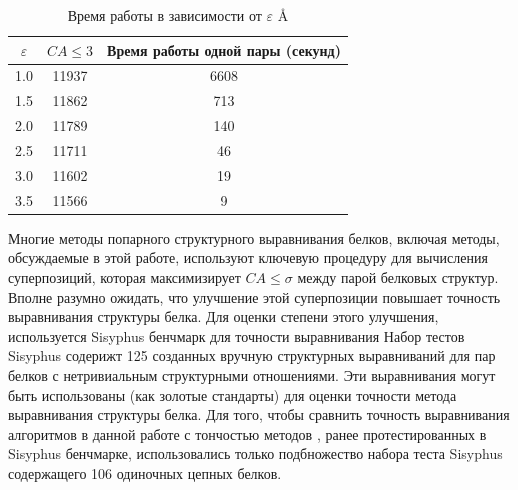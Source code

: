 \documentclass[a4papper]{article}
\newcommand{\angstrom}{\text\normalfont\AA}
\newcommand{\eps}{\varepsilon}
\begin{document}
\begin{center}
\begin{table}
\caption{ Время работы в зависимости от $\eps$ \angstrom}
\begin{tabular}{|c|c|c|}
\hline
$\eps$ & $CA \leq 3$  & Время работы одной пары (секунд)\\
\hline
1.0 & 11937 & 6608\\
1.5 & 11862 & 713\\
2.0 & 11789 & 140\\
2.5 & 11711 & 46\\
3.0 & 11602 & 19\\
3.5 & 11566 & 9\\
\hline
\end{tabular}
\end{table}
\end{center}
Многие методы попарного структурного выравнивания белков, включая методы, обсуждаемые в этой работе, используют ключевую процедуру для вычисления суперпозиций, которая максимизирует $CA \leq \sigma$ между парой белковых структур. Вполне разумно ожидать, что улучшение этой суперпозиции повышает точность выравнивания структуры белка. Для оценки степени этого улучшения, используется Sisyphus бенчмарк для точности выравнивания Набор тестов Sisyphus содерижт 125 созданных вручную структурных выравниваний для пар белков с нетривиальным структурными отношениями. Эти выравнивания могут быть использованы (как золотые стандарты) для оценки точности метода выравнивания структуры белка. Для того, чтобы сравнить точность выравнивания алгоритмов в данной работе с тончостью методов , ранее протестированных в Sisyphus бенчмарке, использовались только подбножество набора теста Sisyphus содержащего 106 одиночных цепных белков.
\end{document}
